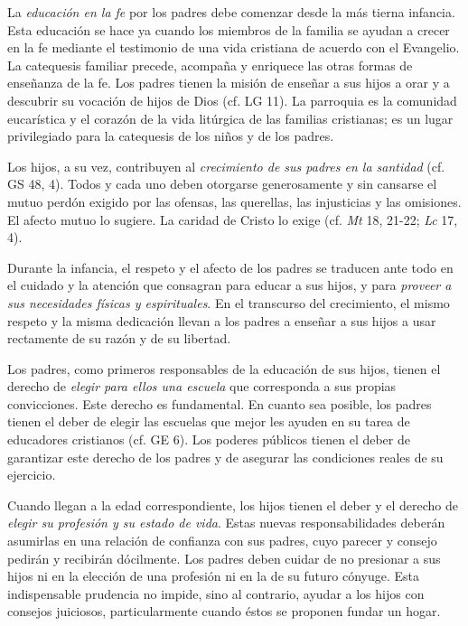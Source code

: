 	 La \emph{educación en la fe} por los padres debe comenzar desde la más tierna infancia. Esta educación se hace ya cuando los miembros de la familia se ayudan a crecer en la fe mediante el testimonio de una vida cristiana de acuerdo con el Evangelio. La catequesis familiar precede, acompaña y enriquece las otras formas de enseñanza de la fe. Los padres tienen la misión de enseñar a sus hijos a orar y a descubrir su vocación de hijos de Dios (cf. LG 11). La parroquia es la comunidad eucarística y el corazón de la vida litúrgica de las familias cristianas; es un lugar privilegiado para la catequesis de los niños y de los padres.
	
	 Los hijos, a su vez, contribuyen al \emph{crecimiento de sus padres en la santidad} (cf. GS 48, 4). Todos y cada uno deben otorgarse generosamente y sin cansarse el mutuo perdón exigido por las ofensas, las querellas, las injusticias y las omisiones. El afecto mutuo lo sugiere. La caridad de Cristo lo exige (cf. \emph{Mt} 18, 21-22; \emph{Lc} 17, 4).
	
	 Durante la infancia, el respeto y el afecto de los padres se traducen ante todo en el cuidado y la atención que consagran para educar a sus hijos, y para \emph{proveer a sus necesidades físicas y espirituales}. En el transcurso del crecimiento, el mismo respeto y la misma dedicación llevan a los padres a enseñar a sus hijos a usar rectamente de su razón y de su libertad.
	
	 Los padres, como primeros responsables de la educación de sus hijos, tienen el derecho de \emph{elegir para ellos una escuela} que corresponda a sus propias convicciones. Este derecho es fundamental. En cuanto sea posible, los padres tienen el deber de elegir las escuelas que mejor les ayuden en su tarea de educadores cristianos (cf. GE 6). Los poderes públicos tienen el deber de garantizar este derecho de los padres y de asegurar las condiciones reales de su ejercicio.
	
	 Cuando llegan a la edad correspondiente, los hijos tienen el deber y el derecho de \emph{elegir su profesión y su estado de vida}. Estas nuevas responsabilidades deberán asumirlas en una relación de confianza con sus padres, cuyo parecer y consejo pedirán y recibirán dócilmente. Los padres deben cuidar de no presionar a sus hijos ni en la elección de una profesión ni en la de su futuro cónyuge. Esta indispensable prudencia no impide, sino al contrario, ayudar a los hijos con consejos juiciosos, particularmente cuando éstos se proponen fundar un hogar.
	
